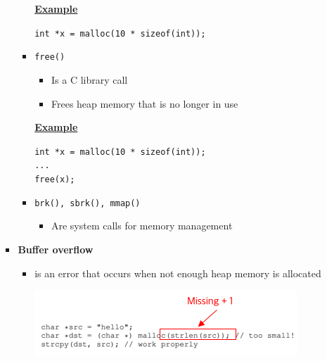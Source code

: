 \documentclass[12pt]{article}
\begin{document}
\begin{enumerate}[1.]
\begin{enumerate}[a)]
\begin{itemize}
\begin{itemize}
                \bigskip

                \underline{\textbf{Example}}

                \bigskip

                \texttt{int *x = malloc(10 * sizeof(int));}

                \bigskip
                \item \texttt{free()}
                \begin{itemize}
                    \item Is a C library call
                    \item Frees heap memory that is no longer in use
                \end{itemize}

                \bigskip

                \underline{\textbf{Example}}

                \bigskip

                \texttt{int *x = malloc(10 * sizeof(int));}\\
                \texttt{...}\\
                \texttt{free(x);}

                \bigskip

                \item \texttt{brk(), sbrk(), mmap()}

                \begin{itemize}
                    \item Are system calls for memory management
                \end{itemize}

            \end{itemize}

            \item \textbf{Buffer overflow}
            \begin{itemize}
                \item is an error that occurs when not enough heap memory is allocated

                \bigskip

                \begin{center}
                \includegraphics[width=0.8\linewidth]{../images/midterm_3_solution_2.png}
                \end{center}
            \end{itemize}
        \end{itemize}


\end{enumerate}
\end{enumerate}
\end{document}
